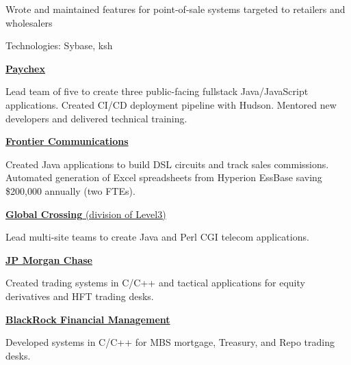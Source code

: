 \documentclass[letterpaper,MMMMyyyy,nonstopmode]{simpleresumecv}
\newcommand{\comment}[1]{\ignorespaces} %
\begin{document}
\begin{Body}
\begin{Detail}
\BulletItem
Wrote and maintained features for point-of-sale systems targeted to retailers and wholesalers

\Gap
Technologies: Sybase, ksh
\end{Detail}
\fi

\else

\BigGap
\Entry
\href{http://www.paychex.com/}
{\textbf{Paychex}}

\begin{Detail}
\BulletItem
	Lead team of five to create three public-facing fullstack Java/JavaScript applications.
	Created CI/CD deployment pipeline with Hudson.
	Mentored new developers and delivered technical training.
\end{Detail}

\BigGap
\Entry
\href{http://www.frontier.com/}
{\textbf{Frontier Communications}}

\begin{Detail}
\BulletItem
Created Java applications to build DSL circuits and track sales commissions\comment{; CruiseControl used for Continuous Integration}.  Automated generation of \comment{20} Excel spreadsheets from Hyperion EssBase saving \$200,000 annually (two FTEs).
\end{Detail}

\BigGap
\Entry
\href{http://www.globalcrossing.com/}
{\textbf{Global  Crossing} (division of Level3)}

\begin{Detail}
\BulletItem
Lead multi-site teams to create Java and Perl CGI telecom applications.
\end{Detail}

\BigGap
\Entry
\href{http://www.jpmorganchase.com/}
{\textbf{JP Morgan Chase}}
\begin{Detail}
\BulletItem
Created trading systems in C/C++ and tactical applications for equity derivatives and HFT trading desks.
\end{Detail}

\BigGap
\Entry
\href{http://www.blackrock.com/}
{\textbf{BlackRock Financial Management}}
\begin{Detail}
\BulletItem
Developed systems in C/C++ for MBS mortgage, Treasury, and Repo trading desks.
\end{Detail}
\fi %
%


\end{Body}
\end{document}
